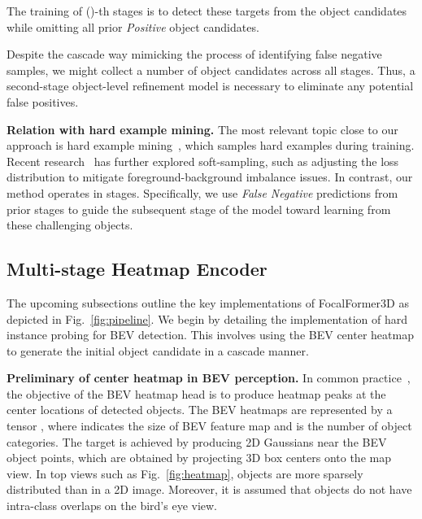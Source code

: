 \documentclass[10pt,twocolumn,letterpaper]{article}
\begin{document}
The training of ()-th stages is to detect these targets  from the object candidates while omitting all prior  \textit{Positive} object candidates.

Despite the cascade way mimicking the process of identifying false negative samples, we might collect a number of object candidates across all stages. Thus, a second-stage object-level refinement model is necessary to eliminate any potential false positives.

\vspace{2mm}
\noindent\textbf{Relation with hard example mining.}
The most relevant topic close to our approach is hard example mining~\cite{exampleselection, ohem}, which samples hard examples during training. Recent research~\cite{focalloss, ghm, pisa} has further explored soft-sampling, such as adjusting the loss distribution to mitigate foreground-background imbalance issues. In contrast, our method operates in stages. Specifically, we use \textit{False Negative} predictions from prior stages to guide the subsequent stage of the model toward learning from these challenging objects. 




\subsection{Multi-stage Heatmap Encoder}
\label{sec:encoder}
The upcoming subsections outline the key implementations of FocalFormer3D as depicted in Fig.~\ref{fig:pipeline}. We begin by detailing the implementation of hard instance probing for BEV detection. This involves using the BEV center heatmap to generate the initial object candidate in a cascade manner.

\vspace{1mm}
\noindent\textbf{Preliminary of center heatmap in BEV perception.} 
In common practice~\cite{centerpoint, centernet, transfusion}, the objective of the BEV heatmap head is to produce heatmap peaks at the center locations of detected objects. The BEV heatmaps are represented by a tensor , where  indicates the size of BEV feature map and  is the number of object categories. The target is achieved by producing 2D Gaussians near the BEV object points, which are obtained by projecting 3D box centers onto the map view. In top views such as Fig.~\ref{fig:heatmap}, objects are more sparsely distributed than in a 2D image. Moreover, it is assumed that objects do not have intra-class overlaps on the bird's eye view.
\end{document}
